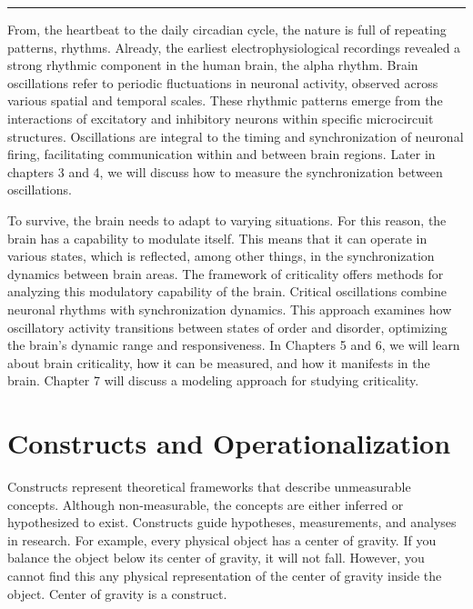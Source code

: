 \rule{\linewidth}{0.4pt} %
\vspace{1pt}           %

From, the heartbeat to the daily circadian cycle, the nature is full of repeating patterns, rhythms.
Already, the earliest electrophysiological recordings revealed a strong rhythmic component in the human brain, the alpha rhythm.
Brain oscillations refer to periodic fluctuations in neuronal activity, observed across various spatial and temporal scales. These rhythmic patterns emerge from the interactions of excitatory and inhibitory neurons within specific microcircuit structures. Oscillations are integral to the timing and synchronization of neuronal firing, facilitating communication within and between brain regions.
Later in chapters 3 and 4, we will discuss how to measure the synchronization between oscillations.

To survive, the brain needs to adapt to varying situations. For this reason, the brain has a capability to modulate itself. 
This means that it can operate in various states, which is reflected, among other things, in the synchronization dynamics between brain areas.
The framework of criticality offers methods for analyzing this modulatory capability of the brain.
Critical oscillations combine neuronal rhythms with synchronization dynamics. 
This approach examines how oscillatory activity transitions between states of order and disorder, optimizing the brain’s dynamic range and responsiveness.
In Chapters 5 and 6, we will learn about brain criticality, how it can be measured, and how it manifests in the brain.
Chapter 7 will discuss a modeling approach for studying criticality.


\section{Constructs and Operationalization}

Constructs represent theoretical frameworks that describe unmeasurable concepts. Although non-measurable, the concepts are either inferred or hypothesized to exist. Constructs guide hypotheses, measurements, and analyses in research. 
For example, every physical object has a center of gravity. If you balance the object below its center of gravity, it will not fall. However, you cannot find this any physical representation of the center of gravity inside the object. Center of gravity is a construct.


